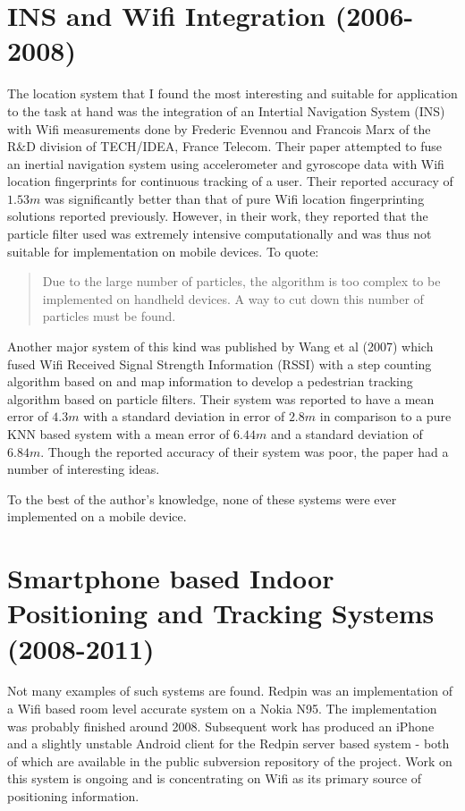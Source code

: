\section{INS and Wifi Integration (2006-2008)}

The location system that I found the most interesting and suitable for application to the task at hand was the integration of an Intertial Navigation System (INS) with Wifi measurements done by Frederic Evennou and Francois Marx of the R\&D division of TECH/IDEA, France Telecom. Their paper \cite{Evennou} attempted to fuse an inertial navigation system using  accelerometer and gyroscope data with Wifi location fingerprints for continuous tracking of a user. Their reported accuracy of $1.53 m$ was significantly better than that of pure Wifi location fingerprinting solutions reported previously. However, in their work, they reported that the particle filter used was extremely intensive computationally and was thus not suitable for implementation on mobile devices. To quote:

\begin{quote}
Due to the large number of particles, the
algorithm is too complex to be implemented on handheld
devices. A way to cut down this number of particles must be
found.\cite{Evennou}
\end{quote}

Another major system of this kind was published by Wang et al (2007)\cite{Wang} which fused Wifi Received Signal Strength Information (RSSI) with a step counting algorithm based on \cite{Ladetto} and map information to develop a pedestrian tracking algorithm based on particle filters. Their system was reported to have a mean error of $4.3 m$ with a standard deviation in error of $2.8 m$ in comparison to a pure KNN based system with a mean error of $6.44 m$ and a standard deviation of $6.84 m$. Though the reported accuracy of their system was poor, the paper had a number of interesting ideas.

To the best of the author's knowledge, none of these systems were ever implemented on a mobile device.

\section{Smartphone based Indoor Positioning and Tracking Systems (2008-2011)}

Not many examples of such systems are found. Redpin\cite{Redpin} was an implementation of a Wifi based room level accurate system on a Nokia N95. The implementation was probably finished around 2008. Subsequent work has produced an iPhone and a slightly unstable Android client for the Redpin server based system - both of which are available in the public subversion repository of the project. Work on this system is ongoing and is concentrating on Wifi as its primary source of positioning information.

